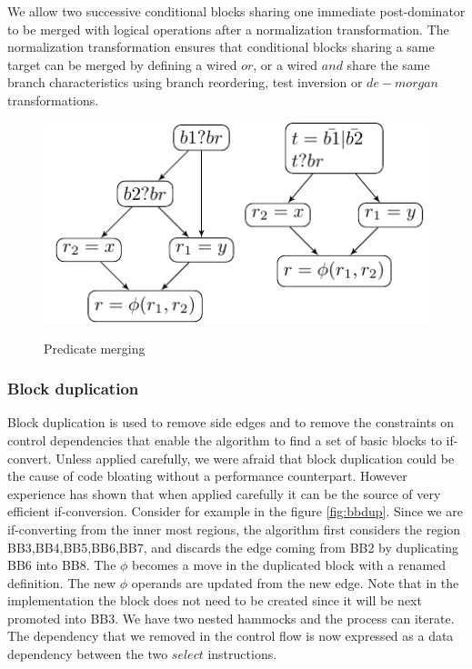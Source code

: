 We allow two successive conditional blocks sharing one immediate post-dominator to be merged with logical operations after a normalization transformation. The normalization transformation ensures that conditional blocks sharing a same target can be merged by defining a wired $or$, or a wired $and$ share the same branch characteristics using branch reordering, test inversion or $de-morgan$ transformations.

\begin{figure}
  \includegraphics[scale=0.8]{phi_merge}
  \label{fig:phi_merge}
\caption{Predicate merging}
\end{figure}


\subsubsection{Block duplication}

Block duplication is used to remove side edges and to remove the constraints on control dependencies that enable the algorithm to find a set of basic blocks to if-convert. Unless applied carefully, we were afraid that block duplication could be the cause of code bloating without a performance counterpart. However experience has shown that when applied carefully it can be the source of very efficient if-conversion. Consider for example in the figure \ref{fig:bbdup}. Since we are if-converting from the inner most regions, the algorithm first considers the region {BB3,BB4,BB5,BB6,BB7}, and discards the edge coming from BB2 by duplicating BB6 into BB8. The $\phi$ becomes a move in the duplicated block with a renamed definition. The new $\phi$ operands are updated from the new edge. Note that in the implementation the block does not need to be created since it will be next promoted into BB3. We have two nested hammocks and the process can iterate. The dependency that we removed in the control flow is now expressed as a data dependency between the two $select$ instructions.

